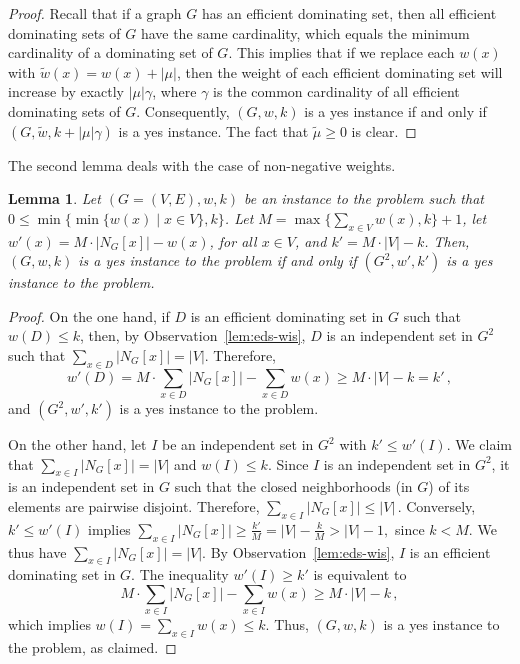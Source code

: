 \documentclass[]{elsarticle}
\newtheorem{lemma}[theorem]{Lemma}
\def\mwis{{\sc{MWIS }}}
\def\minwed{{\sc{Min-WED }}}
\begin{document}
\begin{proof}
Recall that if a graph $G$ has an efficient dominating set, then all efficient dominating sets of $G$ have the same cardinality, which equals the minimum cardinality of a dominating set of $G$. 
This implies that if we replace each $w(x)$ with $\tilde w(x) = w(x)+|\mu|$, then the weight of each efficient dominating set will increase by exactly $|\mu|\gamma$, where $\gamma$ is the common cardinality of all efficient dominating sets of $G$.
Consequently, $(G,w,k)$ is a yes instance if and only if $(G,\tilde w,k+|\mu|\gamma)$ is a yes instance.
The fact that $\tilde \mu\ge 0$ is clear.
\end{proof}

The second lemma deals with the case of non-negative weights.

\begin{lemma}\label{lem:wed-mwis-2}
Let $(G = (V,E), w, k)$ be an instance to the \minwed problem such that $0 \leq \min\{ \min\{ w(x) \mid x \in V \}, k \}$.
Let $M = \max\{\sum_{x\in V}w(x),k\}+1$, let $w'(x) = M\cdot |N_G[x]| - w(x)$, for all $x\in V$, and $k' = M\cdot |V|-k$.
Then, $(G, w, k)$  is a yes instance to the \minwed problem if and only if $(G^2, w', k')$ is a yes instance to the \mwis problem.
\end{lemma}

\begin{proof}
On the one hand, if $D$ is an efficient dominating set in $G$ such that $w(D)\le k$, then, by Observation~\ref{lem:eds-wis}, $D$ is an independent set in $G^2$ such that $\sum_{x\in D}|N_G[x]| = |V|$.
Therefore, 
\[w'(D) = M\cdot \sum_{x\in D}|N_G[x]| - \sum_{x\in D}w(x)\ge M\cdot |V|-k = k'\,,\]
and $(G^2, w', k')$ is a yes instance to the \mwis problem.

On the other hand, let $I$ be an independent set in $G^2$ with $k'\le w'(I)$.
We claim that $\sum_{x\in I}|N_G[x]| = |V|$ and $w(I)\le k$.
Since $I$ is an independent set in $G^2$, it is an independent set in $G$ such that the closed neighborhoods (in $G$) of its elements are pairwise disjoint. 
Therefore, $\sum_{x\in I}|N_G[x]| \le |V|\,.$
Conversely, $k'\leq w'(I)$ implies $\sum_{x\in I}|N_G[x]|\geq \frac{k'}{M}=|V|-\frac{k}{M}>|V|-1,$ since $k<M$.
We thus have $\sum_{x\in I}|N_G[x]| = |V|$.
By Observation~\ref{lem:eds-wis}, $I$ is an efficient dominating set in $G$.
The inequality $w'(I)\ge k'$ is equivalent to
\[ M\cdot \sum_{x\in I}|N_G[x]| - \sum_{x\in I}w(x) \ge M\cdot |V|-k\,,\] 
which implies $w(I) = \sum_{x\in I}w(x)\le k$.
Thus, $(G, w, k)$ is a yes instance to the \minwed problem, as claimed.
\end{proof}
\end{document}
